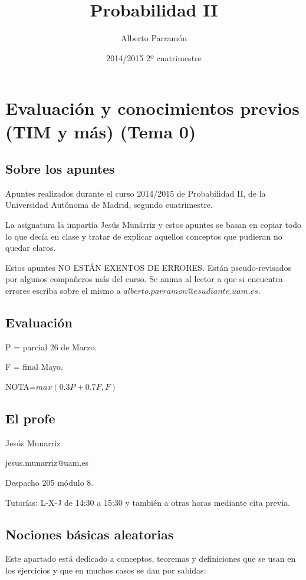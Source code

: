 \documentclass{apuntes}
\author{Alberto Parramón}
\date{2014/2015 2º cuatrimestre}
\title{Probabilidad II}
\begin{document}
\pagestyle{plain}
\maketitle

\tableofcontents
\newpage
\chapter{Evaluación y conocimientos previos (TIM y más) (Tema 0)}


\section{Sobre los apuntes}
Apuntes realizados durante el curso 2014/2015 de Probabilidad II, de la Universidad Autónoma de Madrid, segundo cuatrimestre.

La asignatura la impartía Jesús Munárriz y estos apuntes se basan en copiar todo lo que decía en clase y tratar de explicar aquellos conceptos que pudieran no quedar claros.

Estos apuntes NO ESTÁN EXENTOS DE ERRORES. Están pseudo-revisados por algunos compañeros más del curso. Se anima al lector a que si encuentra errores escriba sobre el mismo a $alberto.parramon@esudiante.uam.es$.


\section{Evaluación}
P = parcial 26 de Marzo.

F = final Mayo.

NOTA=$max(0.3P+0.7F,F)$

\section{El profe}
Jesús Munarriz

jesus.munarriz@uam.es

Despacho 205 módulo 8.

Tutorías: L-X-J de 14:30 a 15:30 y también a otras horas mediante cita previa.

\section{Nociones básicas aleatorias}
Este apartado está dedicado a conceptos, teoremas y definiciones que se usan en los ejercicios y que en muchos casos se dan por sabidas:
\end{document}
